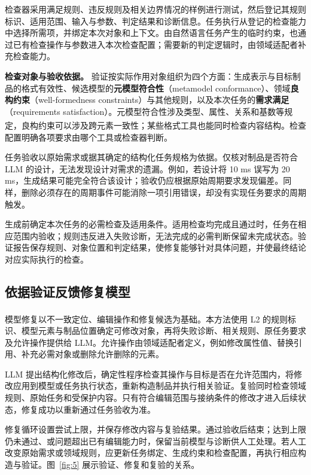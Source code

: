 \documentclass[pdflatex,iicol,sn-mathphys-num]{sn-jnl}
\newcommand{\paperref}[1]{\textsuperscript{\textcolor{citationred}{\citep{#1}}}}
\begin{document}
检查器采用满足规则、违反规则及相关边界情况的样例进行测试，然后登记其规则标识、适用范围、输入与参数、判定结果和诊断信息。任务执行从登记的检查能力中选择所需项，并绑定本次对象和上下文。由自然语言任务产生的临时约束，也通过已有检查操作与参数进入本次检查配置；需要新的判定逻辑时，由领域适配者补充检查能力。


\textbf{检查对象与验收依据。} 验证按实际作用对象组织为四个方面：生成表示与目标制品的格式有效性、候选模型的\textbf{元模型符合性}（metamodel conformance）、领域\textbf{良构约束}（well-formedness constraints）与其他规则，以及本次任务的\textbf{需求满足}（requirements satisfaction）。元模型符合性涉及类型、属性、关系和基数等规定，良构约束可以涉及跨元素一致性；某些格式工具也能同时检查内容结构\paperref{W3C2004XMLSchemaStructures}。检查配置明确各项要求由哪个工具或检查器判断。


任务验收以原始需求或据其确定的结构化任务规格为依据。仅核对制品是否符合 LLM 的设计，无法发现设计对需求的遗漏。例如，若设计将 10 ms 误写为 20 ms，生成结果可能完全符合该设计；验收仍应根据原始周期要求发现偏差。同样，删除必须存在的周期事件可能消除一项引用错误，却没有实现任务要求的周期触发。


生成前确定本次任务的必需检查及适用条件。适用检查均完成且通过时，任务在相应范围内验收；规则违反进入失败诊断，无法完成的必需判断保留未完成状态。验证报告保存规则、对象位置和判定结果，使修复能够针对具体问题，并使最终结论对应实际执行的检查。


\subsection{依据验证反馈修复模型}\label{sec:method-3-7}

模型修复以不一致定位、编辑操作和修复候选为基础\paperref{Marchezan2023}。本方法使用 L2 的规则标识、模型元素与制品位置确定可修改对象，再将失败诊断、相关规则、原任务要求及允许操作提供给 LLM。允许操作由领域适配者定义，例如修改属性值、替换引用、补充必需对象或删除允许删除的元素。


LLM 提出结构化修改后，确定性程序检查其操作与目标是否在允许范围内，将修改应用到模型或任务执行状态，重新构造制品并执行相关验证。复验同时检查领域规则、原始任务和受保护内容。只有符合编辑范围与接纳条件的修改才进入后续状态，修复成功以重新通过任务验收为准。


修复循环设置尝试上限，并保存修改内容与复验结果。通过验收后结束；达到上限仍未通过、或问题超出已有编辑能力时，保留当前模型与诊断供人工处理。若人工改变原始需求或领域规则，应更新任务绑定、生成约束和检查配置，再执行相应构造与验证。图~\ref{fig:5} 展示验证、修复和复验的关系。
\end{document}

